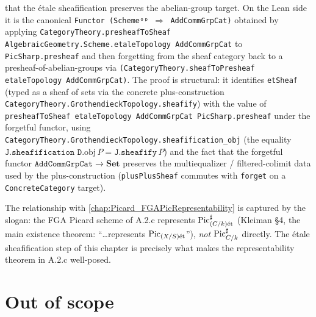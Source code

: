 \begin{itemize}
    that the \'etale sheafification preserves the abelian-group target.
    On the Lean side it is the canonical
    \texttt{Functor (Schemeᵒᵖ \(\Rightarrow\) AddCommGrpCat)}
    obtained by applying
    \texttt{CategoryTheory.presheafToSheaf
    AlgebraicGeometry.Scheme.etaleTopology AddCommGrpCat} to
    \texttt{PicSharp.presheaf} and then forgetting from the sheaf
    category back to a presheaf-of-abelian-groups via
    \texttt{(CategoryTheory.sheafToPresheaf etaleTopology
    AddCommGrpCat)}. The proof is structural: it identifies
    \texttt{etSheaf} (typed as a sheaf of sets via the concrete
    plus-construction
    \texttt{CategoryTheory.GrothendieckTopology.sheafify}) with the
    value of \texttt{presheafToSheaf etaleTopology AddCommGrpCat
    PicSharp.presheaf} under the forgetful functor, using
    \texttt{CategoryTheory.GrothendieckTopology.sheafification\_obj}
    (the equality \(\texttt{J.sheafification D}.\mathrm{obj}\, P =
    \texttt{J.sheafify}\, P\)) and the fact that the forgetful functor
    \(\texttt{AddCommGrpCat} \to \mathbf{Set}\) preserves the
    multiequalizer / filtered-colimit data used by the
    plus-construction (\texttt{plusPlusSheaf} commutes with
    \texttt{forget} on a \texttt{ConcreteCategory} target).
\end{itemize}

The relationship with \cref{chap:Picard_FGAPicRepresentability} is captured by
the slogan: the FGA Picard scheme of A.2.c represents
\(\operatorname{Pic}^\sharp_{(C/k)\mathrm{\acute{e}t}}\) (Kleiman \S 4, the main existence theorem: ``\dots represents
\(\operatorname{Pic}_{(X/S)\mathrm{\acute{e}t}}\)''), \emph{not} \(\operatorname{Pic}^\sharp_{C/k}\) directly. The \'etale
sheafification step of this chapter is precisely what makes the
representability theorem in A.2.c well-posed.

\section{Out of scope}
\label{sec:relpic_out_of_scope}


